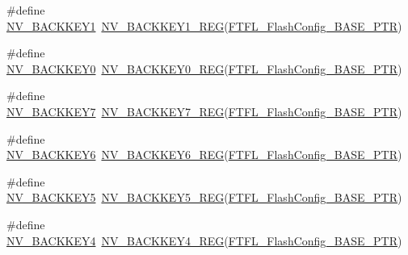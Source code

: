 \begin{DoxyCompactItemize}
\item 
\#define \hyperlink{group___n_v___register___accessor___macros_gae849f8e6eaa76305b07c567463074dc9}{N\+V\+\_\+\+B\+A\+C\+K\+K\+E\+Y1}~\hyperlink{group___n_v___register___accessor___macros_gaa618f324e87cf548f4736270e46fcc57}{N\+V\+\_\+\+B\+A\+C\+K\+K\+E\+Y1\+\_\+\+R\+EG}(\hyperlink{group___n_v___peripheral_gad199a235b90fe3e6afb977f2d6a9c565}{F\+T\+F\+L\+\_\+\+Flash\+Config\+\_\+\+B\+A\+S\+E\+\_\+\+P\+TR})
\item 
\#define \hyperlink{group___n_v___register___accessor___macros_gadb8e2eb4db4de2a485b31c2a1dd393af}{N\+V\+\_\+\+B\+A\+C\+K\+K\+E\+Y0}~\hyperlink{group___n_v___register___accessor___macros_ga905f2d4f792d634634d339e5b6170fe1}{N\+V\+\_\+\+B\+A\+C\+K\+K\+E\+Y0\+\_\+\+R\+EG}(\hyperlink{group___n_v___peripheral_gad199a235b90fe3e6afb977f2d6a9c565}{F\+T\+F\+L\+\_\+\+Flash\+Config\+\_\+\+B\+A\+S\+E\+\_\+\+P\+TR})
\item 
\#define \hyperlink{group___n_v___register___accessor___macros_gaf4c4eb8173a514a0fe632f29e80423d4}{N\+V\+\_\+\+B\+A\+C\+K\+K\+E\+Y7}~\hyperlink{group___n_v___register___accessor___macros_ga7f6090f0eb664b59d0e6e79b492fe8e4}{N\+V\+\_\+\+B\+A\+C\+K\+K\+E\+Y7\+\_\+\+R\+EG}(\hyperlink{group___n_v___peripheral_gad199a235b90fe3e6afb977f2d6a9c565}{F\+T\+F\+L\+\_\+\+Flash\+Config\+\_\+\+B\+A\+S\+E\+\_\+\+P\+TR})
\item 
\#define \hyperlink{group___n_v___register___accessor___macros_ga74544d83ca29fc4d859726eb023dadb9}{N\+V\+\_\+\+B\+A\+C\+K\+K\+E\+Y6}~\hyperlink{group___n_v___register___accessor___macros_ga9d64e9e2568804d0cf1de4cb5a1d3f1f}{N\+V\+\_\+\+B\+A\+C\+K\+K\+E\+Y6\+\_\+\+R\+EG}(\hyperlink{group___n_v___peripheral_gad199a235b90fe3e6afb977f2d6a9c565}{F\+T\+F\+L\+\_\+\+Flash\+Config\+\_\+\+B\+A\+S\+E\+\_\+\+P\+TR})
\item 
\#define \hyperlink{group___n_v___register___accessor___macros_ga7b8e49b6530c2192672343b7f32ae5e8}{N\+V\+\_\+\+B\+A\+C\+K\+K\+E\+Y5}~\hyperlink{group___n_v___register___accessor___macros_gaeeb967dc21f8077cef911eae743d7f12}{N\+V\+\_\+\+B\+A\+C\+K\+K\+E\+Y5\+\_\+\+R\+EG}(\hyperlink{group___n_v___peripheral_gad199a235b90fe3e6afb977f2d6a9c565}{F\+T\+F\+L\+\_\+\+Flash\+Config\+\_\+\+B\+A\+S\+E\+\_\+\+P\+TR})
\item 
\#define \hyperlink{group___n_v___register___accessor___macros_ga5f7ba38a88074b8b658dfe992c73482c}{N\+V\+\_\+\+B\+A\+C\+K\+K\+E\+Y4}~\hyperlink{group___n_v___register___accessor___macros_gae867c53e6918c6a7c16ccba9ee512dc1}{N\+V\+\_\+\+B\+A\+C\+K\+K\+E\+Y4\+\_\+\+R\+EG}(\hyperlink{group___n_v___peripheral_gad199a235b90fe3e6afb977f2d6a9c565}{F\+T\+F\+L\+\_\+\+Flash\+Config\+\_\+\+B\+A\+S\+E\+\_\+\+P\+TR})

\end{DoxyCompactItemize}

